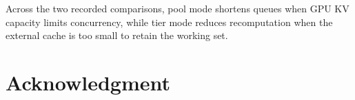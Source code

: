 \documentclass[conference]{IEEEtran}
\begin{document}
Across the two recorded comparisons, pool mode shortens queues when GPU KV
capacity limits concurrency, while tier mode reduces recomputation when the
external cache is too small to retain the working set.

\section*{Acknowledgment}
\par\vspace*{3\baselineskip}



\end{document}
